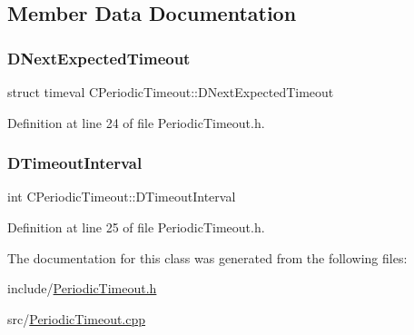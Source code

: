 \subsection{Member Data Documentation}
\hypertarget{classCPeriodicTimeout_ae85c3dd7526ee6b538b7c6478133013c}{}\label{classCPeriodicTimeout_ae85c3dd7526ee6b538b7c6478133013c} 
\subsubsection{\texorpdfstring{D\+Next\+Expected\+Timeout}{DNextExpectedTimeout}}
{\footnotesize\ttfamily struct timeval C\+Periodic\+Timeout\+::\+D\+Next\+Expected\+Timeout\hspace{0.3cm}{\ttfamily [protected]}}



Definition at line 24 of file Periodic\+Timeout.\+h.

\hypertarget{classCPeriodicTimeout_ab0c2b821c02366c9638a66eced3c1f34}{}\label{classCPeriodicTimeout_ab0c2b821c02366c9638a66eced3c1f34} 
\subsubsection{\texorpdfstring{D\+Timeout\+Interval}{DTimeoutInterval}}
{\footnotesize\ttfamily int C\+Periodic\+Timeout\+::\+D\+Timeout\+Interval\hspace{0.3cm}{\ttfamily [protected]}}



Definition at line 25 of file Periodic\+Timeout.\+h.



The documentation for this class was generated from the following files\+:\begin{DoxyCompactItemize}
\item 
include/\hyperlink{PeriodicTimeout_8h}{Periodic\+Timeout.\+h}\item 
src/\hyperlink{PeriodicTimeout_8cpp}{Periodic\+Timeout.\+cpp}\end{DoxyCompactItemize}

